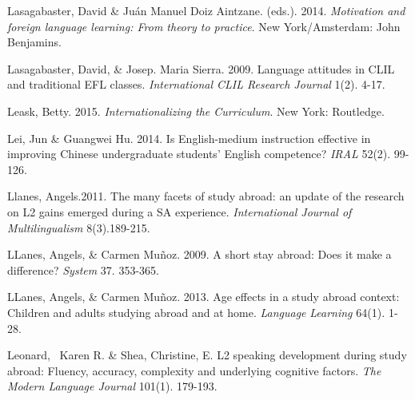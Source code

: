 \begin{styleStandard}
Lasagabaster, David \& Juán Manuel Doiz Aintzane. (eds.). 2014. \textit{Motivation and foreign language learning: From theory to practice}. New York/Amsterdam: John Benjamins. 
\end{styleStandard}


\begin{styleStandard}
Lasagabaster, David, \& Josep. Maria Sierra. 2009. Language attitudes in CLIL and traditional EFL classes. \textit{International CLIL Research Journal} 1(2). 4-17.
\end{styleStandard}


\begin{styleStandard}
Leask, Betty. 2015. \textit{Internationalizing th}\textit{e Curriculum}. New York: Routledge.
\end{styleStandard}


\begin{styleStandard}
Lei, Jun \& Guangwei Hu. 2014. Is English-medium instruction effective in improving Chinese undergraduate students’ English competence? \textit{IRAL }52(2). 99-126.
\end{styleStandard}


\begin{styleStandard}
Llanes, Angels.2011. The many facets of study abroad: an update of the research on L2 gains emerged during a SA experience. \textit{International Journal of Multilingualism }8(3).189-215. 
\end{styleStandard}


\begin{styleStandard}
LLanes, Angels, \& Carmen Muñoz. 2009. A short stay abroad: Does it make a difference? \textit{System} 37. 353-365.
\end{styleStandard}


\begin{styleStandard}
LLanes, Angels, \& Carmen Muñoz. 2013. Age effects in a study abroad context: Children and adults studying abroad and at home. \textit{Language }\textit{Learning }64(1)\textit{. }1-28.
\end{styleStandard}


\begin{styleStandard}
Leonard, \ Karen R. \& Shea, Christine, E. L2 speaking development during study abroad: Fluency, accuracy, complexity and underlying cognitive factors. \textit{The Modern Language Journal} 101(1). 179-193.
\end{styleStandard}


